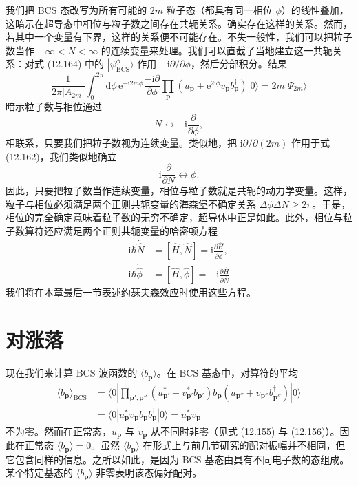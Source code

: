我们把 BCS 态改写为所有可能的 $2m$ 粒子态（都具有同一相位 $\phi$）的线性叠加，这暗示在超导态中相位与粒子数之间存在共轭关系。确实存在这样的关系。然而，若其中一个变量有下界，这样的关系便不可能存在。不失一般性，我们可以把粒子数当作 $-\infty<N<\infty$ 的连续变量来处理。我们可以直截了当地建立这一共轭关系：对式 (12.164) 中的 $\left|\psi^{\phi}_{\mathrm{BCS}}\right.\rangle$ 作用 $-\mathrm i\partial/\partial\phi$，然后分部积分。结果
\begin{equation*}
\frac{1}{2\pi|A_{2m}|}\int_0^{2\pi}\mathrm d\phi\,\mathrm e^{-\mathrm i 2m\phi}\frac{-\mathrm i\partial}{\partial\phi}\prod_{\mathbf p}\left(u_{\mathbf p}+\mathrm e^{2\mathrm i\phi}v_{\mathbf p}b^\dagger_{\mathbf p}\right)|0\rangle=2m|\Psi_{2m}\rangle \tag{12.167}
\end{equation*}
暗示粒子数与相位通过
\begin{equation*}
N\leftrightarrow-\mathrm i\frac{\partial}{\partial\phi}, \tag{12.168}
\end{equation*}
相联系，只要我们把粒子数视为连续变量。类似地，把 $\mathrm i\partial/\partial(2m)$ 作用于式 (12.162)，我们类似地确立
\begin{equation*}
\mathrm i\frac{\partial}{\partial N}\leftrightarrow\phi. \tag{12.169}
\end{equation*}
因此，只要把粒子数当作连续变量，相位与粒子数就是共轭的动力学变量。这样，粒子与相位必须满足两个正则共轭变量的海森堡不确定关系 $\Delta\phi\Delta N\ge 2\pi$。于是，相位的完全确定意味着粒子数的无穷不确定，超导体中正是如此。此外，相位与粒子数算符还应满足两个正则共轭变量的哈密顿方程
\begin{align*}
\mathrm i\hbar\dot{\hat N}&=\left[\hat H,\hat N\right]=\mathrm i\frac{\partial\hat H}{\partial\hat\phi},\\
\mathrm i\hbar\dot{\hat\phi}&=\left[\hat H,\hat\phi\right]=-\mathrm i\frac{\partial\hat H}{\partial\hat N} \tag{12.170}
\end{align*}
我们将在本章最后一节表述约瑟夫森效应时使用这些方程。

\section{对涨落}

现在我们来计算 BCS 波函数的 $\langle b_{\mathbf p}\rangle$。在 BCS 基态中，对算符的平均
\begin{align*}
\langle b_{\mathbf p}\rangle_{\mathrm{BCS}}&=\langle 0|\prod_{\mathbf p',\mathbf p''}\left(u^*_{\mathbf p'}+v^*_{\mathbf p'}b_{\mathbf p'}\right)b_{\mathbf p}\left(u_{\mathbf p''}+v_{\mathbf p''}b^\dagger_{\mathbf p''}\right)|0\rangle\\
&=\langle 0|u^*_{\mathbf p}v_{\mathbf p}b_{\mathbf p}b^\dagger_{\mathbf p}|0\rangle=u^*_{\mathbf p}v_{\mathbf p} \tag{12.171}
\end{align*}
不为零。然而在正常态，$u_{\mathbf p}$ 与 $v_{\mathbf p}$ 从不同时非零（见式 (12.155) 与 (12.156)）。因此在正常态 $\langle b_{\mathbf p}\rangle=0$。虽然 $\langle b_{\mathbf p}\rangle$ 在形式上与前几节研究的配对振幅并不相同，但它包含同样的信息。之所以如此，是因为 BCS 基态由具有不同电子数的态组成。某个特定基态的 $\langle b_{\mathbf p}\rangle$ 非零表明该态偏好配对。

